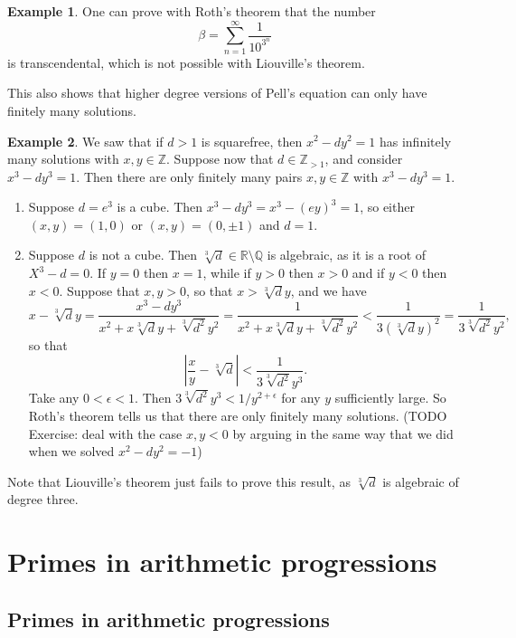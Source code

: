 \documentclass{article}
\newcommand{\Z}{\mathbb{Z}}
\newcommand{\Q}{\mathbb{Q}}
\newcommand{\R}{\mathbb{R}}
\newcommand{\rb}[1]{\left( #1 \right)}
\newcommand{\abs}[1]{\left\lvert #1 \right\rvert}
\theoremstyle{definition}\newtheorem{definition}{Definition}
\theoremstyle{definition}\newtheorem{remark}[definition]{Remark}
\theoremstyle{definition}\newtheorem*{example}{Example}
\theoremstyle{definition}\newtheorem*{note}{Note}
\begin{document}
\begin{example}
One can prove with Roth's theorem that the number
$$ \beta = \sum_{n = 1}^\infty \dfrac{1}{10^{3^n}} $$
is transcendental, which is not possible with Liouville's theorem.
\end{example}

This also shows that higher degree versions of Pell's equation can only have finitely many solutions.

\begin{example}
We saw that if $ d > 1 $ is squarefree, then $ x^2 - dy^2 = 1 $ has infinitely many solutions with $ x, y \in \Z $. Suppose now that $ d \in \Z_{> 1} $, and consider $ x^3 - dy^3 = 1 $. Then there are only finitely many pairs $ x, y \in \Z $ with $ x^3 - dy^3 = 1 $.
\begin{enumerate}
\item Suppose $ d = e^3 $ is a cube. Then $ x^3 - dy^3 = x^3 - \rb{ey}^3 = 1 $, so either $ \rb{x, y} = \rb{1, 0} $ or $ \rb{x, y} = \rb{0, \pm 1} $ and $ d = 1 $.
\item Suppose $ d $ is not a cube. Then $ \sqrt[3]{d} \in \R \setminus \Q $ is algebraic, as it is a root of $ X^3 - d = 0 $. If $ y = 0 $ then $ x = 1 $, while if $ y > 0 $ then $ x > 0 $ and if $ y < 0 $ then $ x < 0 $. Suppose that $ x, y > 0 $, so that $ x > \sqrt[3]{d}y $, and we have
$$ x - \sqrt[3]{d}y = \dfrac{x^3 - dy^3}{x^2 + x\sqrt[3]{d}y + \sqrt[3]{d^2}y^2} = \dfrac{1}{x^2 + x\sqrt[3]{d}y + \sqrt[3]{d^2}y^2} < \dfrac{1}{3\rb{\sqrt[3]{d}y}^2} = \dfrac{1}{3\sqrt[3]{d^2}y^2}, $$
so that
$$ \abs{\dfrac{x}{y} - \sqrt[3]{d}} < \dfrac{1}{3\sqrt[3]{d^2}y^3}. $$
Take any $ 0 < \epsilon < 1 $. Then $ 3\sqrt[3]{d^2}y^3  < 1 / y^{2 + \epsilon} $ for any $ y $ sufficiently large. So Roth's theorem tells us that there are only finitely many solutions. (TODO Exercise: deal with the case $ x, y < 0 $ by arguing in the same way that we did when we solved $ x^2 - dy^2 = -1 $)
\end{enumerate}
Note that Liouville's theorem just fails to prove this result, as $ \sqrt[3]{d} $ is algebraic of degree three.
\end{example}

\section{Primes in arithmetic progressions}

\subsection{Primes in arithmetic progressions}
\end{document}
